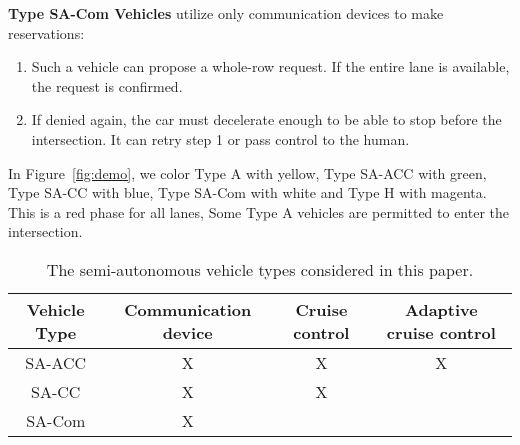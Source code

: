 \noindent
\textbf{Type SA-Com Vehicles} utilize only communication devices
to make reservations:
\begin{enumerate}

\item Such a vehicle can propose a whole-row request.  If the entire
lane is available, the request is confirmed.

\item If denied again, the car must decelerate enough to be able to
stop before the intersection.  It can retry step 1 or pass control to
the human.

\end{enumerate}

In Figure~\ref{fig:demo}, we color Type A with yellow, Type SA-ACC
with green, Type SA-CC with blue, Type SA-Com with white and Type H
with magenta. This is a red phase for all lanes, Some Type A vehicles
are permitted to enter the intersection.







\begin{table*}
\centering
\caption{The semi-autonomous vehicle types considered in this paper.}
\label{table:type}
\begin{tabular}{|c|c|c|c|}
  \hline
  Vehicle Type & Communication device & Cruise control & Adaptive cruise control \\
  \hline
  SA-ACC & X & X & X  \\
  \hline
  SA-CC & X & X &  \\
  \hline
  SA-Com & X & &  \\
  \hline
\end{tabular}
\end{table*}


